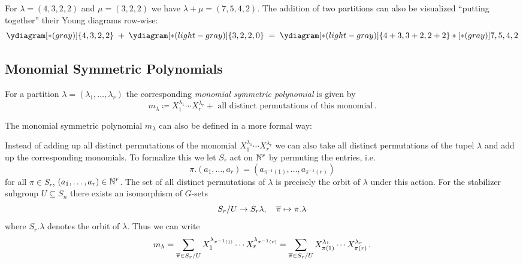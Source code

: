 \begin{example}
  For $\lambda = (4,3,2,2)$ and $\mu = (3,2,2)$ we have $\lambda + \mu = (7,5,4,2)$.
  The addition of two partitions can also be visualized “putting together” their Young diagrams row-wise:
  \[
                \ydiagram[*(gray)]{4,3,2,2}
          \;+\; \ydiagram[*(light-gray)]{3,2,2,0}
    \;=\; \ydiagram[*(light-gray)]{4+3,3+2,2+2} * [*(gray)]{7,5,4,2}
  \]
\end{example}



\subsection{Monomial Symmetric Polynomials}

\begin{definition}
  For a partition $\lambda = (\lambda_1, \dotsc, \lambda_r)$ the corresponding \emph{monomial symmetric polynomial} is given by
  \[
              m_\lambda
    \coloneqq   X_1^{\lambda_1} \dotsm X_r^{\lambda_r}
              + \text{ all distinct permutations of this monomial} \,.
  \]
\end{definition}


\begin{remark}
  The monomial symmetric polynomial $m_\lambda$ can also be defined in a more formal way:
  
  Instead of adding up all distinct permutations of the monomial $X_1^{\lambda_1} \dotsm X_r^{\lambda_r}$ we can also take all distinct permutations of the tupel $\lambda$ and add up the corresponding monomials.
  To formalize this we let $S_r$ act on $\mathbb{N}^r$ by permuting the entries, i.e.\
  \[
      \pi.(a_1, \dotsc, a_r)
    = ( a_{\pi^{-1}(1)}, \dotsc, a_{\pi^{-1}(r)} )
  \]
  for all $\pi \in S_r$, $(a_1, \dotsc, a_r) \in \mathbb{N}^r$.
  The set of all distinct permutations of $\lambda$ is precisely the orbit of $\lambda$ under this action.
  For the stabilizer subgroup $U \subseteq S_n$ there exists an isomorphism of $G$-sets
  \[
            S_r / U
    \to     S_r \lambda,
    \quad   \overline{\pi}
    \mapsto \pi.\lambda
  \]
  where $S_r.\lambda$ denotes the orbit of $\lambda$.
  Thus we can write
  \[
      m_\lambda
    = \sum_{\overline{\pi} \in S_r/U} X_1^{\lambda_{\pi^{-1}(1)}} \dotsm X_r^{\lambda_{\pi^{-1}(r)}}
    = \sum_{\overline{\pi} \in S_r/U} X_{\pi(1)}^{\lambda_1} \dotsm X_{\pi(r)}^{\lambda_r} \,.
  \]
\end{remark}


